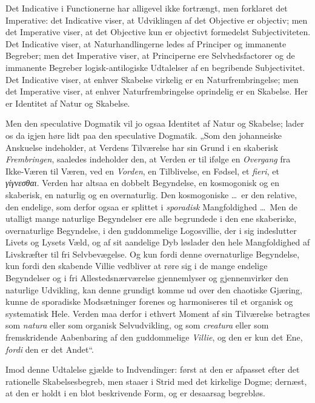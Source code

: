 \documentclass[12pt]{book}
\newcommand{\opage}[1]{\marginnote{\footnotesize\textit{[#1]}}}
\begin{document}
Det Indicative i Functionerne har alligevel ikke fortrængt,
men forklaret det Imperative: det Indicative viser, at
Ud\opage{160}viklingen af det Objective er objectiv; men det Imperative
viser, at det Objective kun er objectivt formedelst Subjectiviteten.
Det Indicative viser, at Naturhandlingerne ledes af
Principer og immanente Begreber; men det Imperative viser,
at Principerne ere Selvhedsfactorer og de immanente Begreber
logisk-antilogiske Udtalelser af en begribende Subjectivitet.
Det Indicative viser, at enhver Skabelse virkelig er en
Naturfrembringelse; men det Imperative viser, at enhver
Naturfrembringelse oprindelig er en Skabelse. Her er Identitet
af Natur og Skabelse.

Men den speculative Dogmatik vil jo ogsaa Identitet af
Natur og Skabelse; lader os da igjen høre lidt paa den speculative
Dogmatik. „Som den johanneiske Anskuelse indeholder,
at Verdens Tilværelse har sin Grund i en skaberisk
\emph{Frembringen}, saaledes indeholder den, at Verden er til
ifølge en \emph{Overgang} fra Ikke-Væren til Væren, ved en \emph{Vorden},
en Tilblivelse, en Fødsel, et \textit{fieri}, et \textit{γίγνεσθαι}. Verden
har altsaa en dobbelt Begyndelse, en kosmogonisk og en skaberisk,
en naturlig og en overnaturlig. Den kosmogoniske \dots\
er den relative, den endelige, som derfor ogsaa er splittet i \emph{sporadisk}
Mangfoldighed \dots\ Men de utalligt mange naturlige
Begyndelser ere alle begrundede i den ene skaberiske, overnaturlige
Begyndelse, i den guddommelige Logosvillie, der i
sig indeslutter Livets og Lysets Væld, og af sit aandelige Dyb
løslader den hele Mangfoldighed af Livskræfter til fri Selvbevægelse.
Og kun fordi denne overnaturlige Begyndelse, kun fordi
den skabende Villie vedbliver at røre sig i de mange endelige Begyndelser
og i fri Allestedsnærværelse gjennemlyser og gjennemvirker
den naturlige Udvikling, kan denne grundigt komme ud
over den chaotiske Gjæring, kunne de sporadiske Modsætninger
forenes og harmoniseres til et organisk og systematisk Hele.
Verden maa derfor i ethvert Moment af sin Tilværelse betragtes
som \textit{natura} eller som organisk Selvudvikling, og som %
\textit{creatura} eller som fremskridende Aabenbaring af den
guddom\opage{161}melige \emph{Villie}, og den er kun det Ene, \emph{fordi} den er det
Andet“.

Imod denne Udtalelse gjælde to Indvendinger: først at
den er afpasset efter det rationelle Skabelsesbegreb, men
staaer i Strid med det kirkelige Dogme; dernæst, at den er
holdt i en blot beskrivende Form, og er desaarsag begrebløs.
\end{document}
